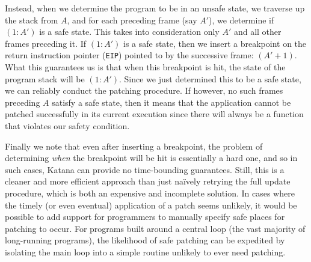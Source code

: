 Instead, when we determine the program to be in an unsafe state, we
traverse up the stack from $A$, and for each preceding frame (say
$A'$), we determine if $(1:A')$ is a safe state. This takes into
consideration only $A'$ and all other frames preceding it. If $(1:A')$
is a safe state, then we insert a breakpoint on the return instruction
pointer ({\tt EIP}) pointed to by the successive frame: $(A' +
1)$. What this guarantees us is that when this breakpoint is hit, the
state of the program stack will be $(1:A')$. Since we just determined
this to be a safe state, we can reliably conduct the patching
procedure. If however, no such frames preceding $A$ satisfy a safe
state, then it means that the application cannot be patched
successfully in its current execution since there will always be a
function that violates our safety condition.

Finally we note that even after inserting a breakpoint, the problem of
determining {\it when} the breakpoint will be hit is essentially a
hard one, and so in such cases, Katana can provide no time-bounding
guarantees. Still, this is a cleaner and more efficient approach than
just na\"{i}vely retrying the full update procedure, which is both an
expensive and incomplete solution.
In cases where the timely (or even eventual) application of a patch
seems unlikely, it would be possible to add support for programmers to
manually specify safe places for patching to occur. For programs built
around a central loop (the vast majority of long-running programs),
the likelihood of safe patching can be expedited by isolating the main
loop into a simple routine unlikely to ever need patching.


